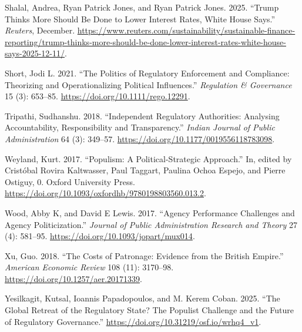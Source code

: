 \documentclass[
  11pt,
  letterpaper,
  DIV=11,
  numbers=noendperiod]{scrartcl}
\newlength{\cslhangindent}
\newenvironment{CSLReferences}[2] %
 {\begin{list}{}{%
  \setlength{\itemindent}{0pt}
  \setlength{\leftmargin}{0pt}
  \setlength{\parsep}{0pt}
  \ifodd #1
   \setlength{\leftmargin}{\cslhangindent}
   \setlength{\itemindent}{-1\cslhangindent}
  \fi
  \setlength{\itemsep}{#2\baselineskip}}}
 {\end{list}}
\begin{document}
\begin{CSLReferences}{1}{0}
Shalal, Andrea, Ryan Patrick Jones, and Ryan Patrick Jones. 2025.
{``Trump Thinks More Should Be Done to Lower Interest Rates, White House
Says.''} \emph{Reuters}, December.
\url{https://www.reuters.com/sustainability/sustainable-finance-reporting/trump-thinks-more-should-be-done-lower-interest-rates-white-house-says-2025-12-11/}.

Short, Jodi L. 2021. {``The Politics of Regulatory Enforcement and
Compliance: Theorizing and Operationalizing Political Influences.''}
\emph{Regulation \& Governance} 15 (3): 653--85.
\url{https://doi.org/10.1111/rego.12291}.

Tripathi, Sudhanshu. 2018. {``Independent Regulatory Authorities:
Analysing Accountability, Responsibility and Transparency.''}
\emph{Indian Journal of Public Administration} 64 (3): 349--57.
\url{https://doi.org/10.1177/0019556118783098}.

Weyland, Kurt. 2017. {``Populism: A Political-Strategic Approach.''} In,
edited by Cristóbal Rovira Kaltwasser, Paul Taggart, Paulina Ochoa
Espejo, and Pierre Ostiguy, 0. Oxford University Press.
\url{https://doi.org/10.1093/oxfordhb/9780198803560.013.2}.

Wood, Abby K, and David E Lewis. 2017. {``Agency Performance Challenges
and Agency Politicization.''} \emph{Journal of Public Administration
Research and Theory} 27 (4): 581--95.
\url{https://doi.org/10.1093/jopart/mux014}.

Xu, Guo. 2018. {``The Costs of Patronage: Evidence from the British
Empire.''} \emph{American Economic Review} 108 (11): 3170--98.
\url{https://doi.org/10.1257/aer.20171339}.

Yesilkagit, Kutsal, Ioannis Papadopoulos, and M. Kerem Coban. 2025.
{``The Global Retreat of the Regulatory State? The Populist Challenge
and the Future of Regulatory Governance.''}
\url{https://doi.org/10.31219/osf.io/wrhq4_v1}.

\end{CSLReferences}
\end{document}
